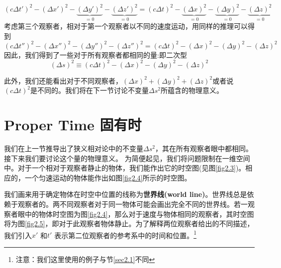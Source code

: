 \begin{equation}\label{equ2.11}
\left( c \Delta t' \right)^2
-\left(\Delta x' \right)^2
-\underbrace{\left(\Delta y' \right)^2}_{=0}
-\underbrace{\left(\Delta z' \right)^2}_{=0}
=
\left( c \Delta t \right)^2
-\underbrace{\left(\Delta x \right)^2}_{=0}
-\underbrace{\left(\Delta y \right)^2}_{=0}
-\underbrace{\left(\Delta z \right)^2}_{=0}
\end{equation}
考虑第三个观察者，相对于第一个观察者以不同的速度运动，用同样的推理可以得到
\begin{equation}\label{equ2.12}
\left( c \Delta t'' \right)^2
-\left(\Delta x'' \right)^2
-\left(\Delta y'' \right)^2
-\left(\Delta z'' \right)^2
=
\left( c \Delta t \right)^2
-\left(\Delta x \right)^2
-\left(\Delta y \right)^2
-\left(\Delta z \right)^2
\end{equation}
因此，我们得到了一些对于所有观察者都相同的量:即二次型
\begin{equation}\label{equ2.13}
(\Delta s)^2
\equiv\left( c \Delta t \right)^2
-\left(\Delta x \right)^2
-\left(\Delta y \right)^2
-\left(\Delta z \right)^2
\end{equation}

此外，我们还能看出对于不同观察者，$(\Delta x)^2+(\Delta y)^2+(\Delta z)^2$或者说$(c\Delta t)^2$是不同的。我们将在下一节讨论不变量$\Delta s^2$所蕴含的物理意义。


\section[固有时]{Proper Time \quad 固有时}
\label{sec2.2}
我们在上一节推导出了狭义相对论中的不变量$\Delta s^2$，其在所有观察者眼中都相同。接下来我们要讨论这个量的物理意义。
为简便起见，我们将问题限制在一维空间中。对于一个相对于观察者静止的物体，我们能作出它的时空图(见图\ref{fig2.3})。相应的，一个匀速运动的物体能作出如图\ref{fig2.4}所示的时空图。

我们画来用于确定物体在时空中位置的线称为{\bf{世界线(world line)}}。世界线总是依赖于观察者的。两不同观察者对于同一物体可能会画出完全不同的世界线。若一观察者眼中的物体时空图为图\ref{fig2.4}，那么对于速度与物体相同的观察者，其时空图将为图\ref{fig2.5}，即对于此观察者物体静止。为了解释两位观察者给出的不同描述，我们引入$x'$ 和$t'$ 表示第二位观察者的参考系中的时间和位置。\footnote{注意：我们这里使用的例子与节\ref{sec2.1}不同}

